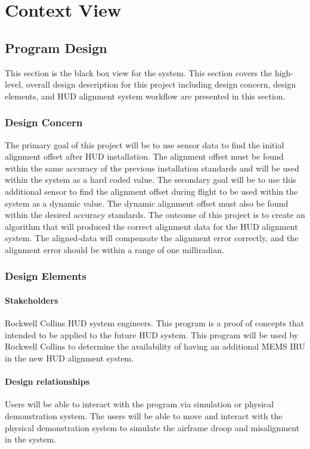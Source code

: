 

\section{Context View}
	\subsection{Program Design}
	This section is the black box view for the system. This section covers the high-level, overall design description for this project including design concern, design elements, and HUD alignment system workflow are presented in this section.\\

		\subsubsection{Design Concern}
		The primary goal of this project will be to use sensor data to find the initial alignment offset after HUD installation. The alignment offset must be found within the same accuracy of the previous installation standards and will be used within the system as a hard coded value. The secondary goal will be to use this additional sensor to find the alignment offset during flight to be used within the system as a dynamic value. The dynamic alignment offset must also be found within the desired accuracy standards. The outcome of this project is to create an algorithm that will produced the correct alignment data for the HUD alignment system. The aligned-data will compensate the alignment error correctly, and the alignment error should be within a range of one milliradian.\\

		\subsubsection{\textbf{Design Elements}}
		\paragraph{Stakeholders} Rockwell Collins HUD system engineers. This program is a proof of concepts that intended to be applied to the future HUD system. This program will be used by Rockwell Collins to determine the availability of having an additional MEMS IRU in the new HUD alignment system. 

		\paragraph{Design relationships} Users will be able to interact with the program via simulation or physical demonstration system. The users will be able to move and interact with the physical demonstration system to simulate the airframe droop and misalignment in the system. 

